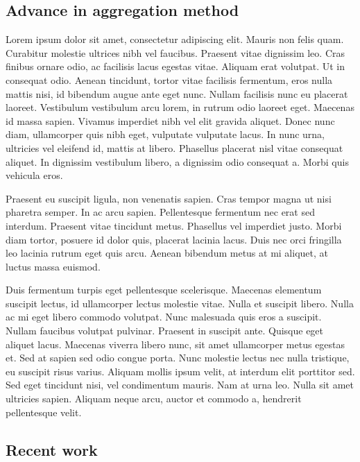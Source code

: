 \documentclass[english]{tktltiki}
\begin{document}
\subsection{Advance in aggregation method}


Lorem ipsum dolor sit amet, consectetur adipiscing elit. Mauris non felis quam. Curabitur molestie ultrices nibh vel faucibus. Praesent vitae dignissim leo. Cras finibus ornare odio, ac facilisis lacus egestas vitae. Aliquam erat volutpat. Ut in consequat odio. Aenean tincidunt, tortor vitae facilisis fermentum, eros nulla mattis nisi, id bibendum augue ante eget nunc. Nullam facilisis nunc eu placerat laoreet. Vestibulum vestibulum arcu lorem, in rutrum odio laoreet eget. Maecenas id massa sapien. Vivamus imperdiet nibh vel elit gravida aliquet. Donec nunc diam, ullamcorper quis nibh eget, vulputate vulputate lacus. In nunc urna, ultricies vel eleifend id, mattis at libero. Phasellus placerat nisl vitae consequat aliquet. In dignissim vestibulum libero, a dignissim odio consequat a. Morbi quis vehicula eros.

Praesent eu suscipit ligula, non venenatis sapien. Cras tempor magna ut nisi pharetra semper. In ac arcu sapien. Pellentesque fermentum nec erat sed interdum. Praesent vitae tincidunt metus. Phasellus vel imperdiet justo. Morbi diam tortor, posuere id dolor quis, placerat lacinia lacus. Duis nec orci fringilla leo lacinia rutrum eget quis arcu. Aenean bibendum metus at mi aliquet, at luctus massa euismod.

Duis fermentum turpis eget pellentesque scelerisque. Maecenas elementum suscipit lectus, id ullamcorper lectus molestie vitae. Nulla et suscipit libero. Nulla ac mi eget libero commodo volutpat. Nunc malesuada quis eros a suscipit. Nullam faucibus volutpat pulvinar. Praesent in suscipit ante. Quisque eget aliquet lacus. Maecenas viverra libero nunc, sit amet ullamcorper metus egestas et. Sed at sapien sed odio congue porta. Nunc molestie lectus nec nulla tristique, eu suscipit risus varius. Aliquam mollis ipsum velit, at interdum elit porttitor sed. Sed eget tincidunt nisi, vel condimentum mauris. Nam at urna leo. Nulla sit amet ultricies sapien. Aliquam neque arcu, auctor et commodo a, hendrerit pellentesque velit.


\subsection{Recent work}
\end{document}
